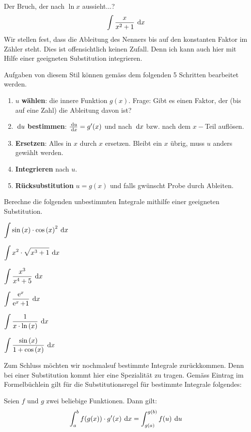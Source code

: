 	\begin{beispiel}
		Der Bruch, der nach $\ln{x}$ aussieht...?\[\int\frac{x}{x^2+1}\:\operatorname{d}\!{x}\] Wir stellen fest, dass die Ableitung des Nenners bis auf den konstanten Faktor im Zähler steht. Dies ist offensichtlich keinen Zufall. Denn ich kann auch hier mit Hilfe einer geeigneten Substitution integrieren.\\[5pt]
	\end{beispiel}
	Aufgaben von diesem Stil können gemäss dem folgenden 5 Schritten bearbeitet werden.
	\begin{algo}
		\begin{enumerate}
			\item $u$ \textbf{wählen}: die innere Funktion $g(x)$. Frage: Gibt es einen Faktor, der (bis auf eine Zahl) die
			Ableitung davon ist?
			\item $\:\operatorname{d}\!{u}$ \textbf{bestimmen}: $\frac{\:\operatorname{d}\!{u}}{\:\operatorname{d}\!{x}}=g'(x)$ und nach $\:\operatorname{d}\!{x}$ bzw. nach dem $x-$Teil auflösen.
			\item \textbf{Ersetzen}: Alles in $x$ durch $x$ ersetzen. Bleibt ein $x$ übrig, muss $u$ anders gewählt werden.
			\item \textbf{Integrieren} nach $u$.
			\item \textbf{Rücksubstitution} $u=g(x)$ und falls gwünscht Probe durch Ableiten.
		\end{enumerate}
	\end{algo}
	\begin{aufgabe}
		Berechne die folgenden unbestimmten Integrale mithilfe einer geeigneten Substitution.
		\begin{enumcols}[2]
			\item $\ds\int\sin{x}\*\cos{x}^2\d{x}$
			\item $\displaystyle\int x^2\cdot\sqrt{x^3+1}\:\operatorname{d}\!{x}$
			\item $\displaystyle\int\frac{x^3}{x^4+5}\:\operatorname{d}\!{x}$
			\item $\displaystyle\int\frac{\operatorname{\operatorname{e}}^{x}}{\operatorname{\operatorname{e}}^{x}+1}\:\operatorname{d}\!{x}$
			\item $\ds\int\frac{1}{x\*\ln{x}}\d{x}$
			\item $\ds\int\frac{\sin{x}}{1+\cos{x}}\d{x}$
		\end{enumcols}
	\end{aufgabe}
	Zum Schluss möchten wir nochmalsuf bestimmte Integrale zurückkommen. Denn bei einer Substitution kommt hier eine Spezialität zu tragen.
	Gemäss Eintrag im Formelbüchlein gilt für die Substitutionsregel für bestimmte Integrale folgendes:
	\begin{satz}
		Seien $f$ und $g$ zwei beliebige Funktionen. Dann gilt: \[\int_a^b f(g(x))\cdot g'(x)\:\operatorname{d}\!{x} = \int_{g(a)}^{g(b)} f(u)\:\operatorname{d}\!{u}\]
	\end{satz}
